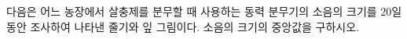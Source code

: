 다음은 어느 농장에서 살충제를 분무할 때 사용하는 동력 분무기의 소음의 크기를 $20$일 동안 조사하여 나타낸 줄기와 잎 그림이다. 소음의 크기의 중앙값을 구하시오.
\par\smallskip\begin{center}\resizebox{\ifdim\width>\linewidth\linewidth\else\width\fi}{!}{}\end{center}
